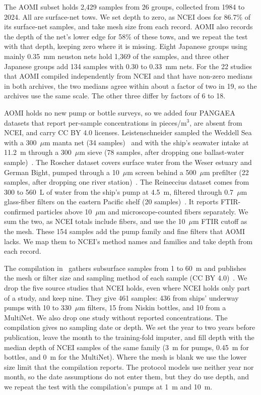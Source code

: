 \documentclass[12pt,a4paper]{report}
\begin{document}
The AOMI subset holds 2,429 samples from 26 groups, collected from 1984 to 2024. All are surface-net tows. We set depth to zero, as NCEI does for 86.7\% of its surface-net samples, and take mesh size from each record. AOMI also records the depth of the net's lower edge for 58\% of these tows, and we repeat the test with that depth, keeping zero where it is missing. Eight Japanese groups using mainly 0.35~mm neuston nets hold 1,369 of the samples, and three other Japanese groups add 134 samples with 0.30 to 0.33~mm nets. For the 22 studies that AOMI compiled independently from NCEI and that have non-zero medians in both archives, the two medians agree within about a factor of two in 19, so the archives use the same scale. The other three differ by factors of 6 to 18.

AOMI holds no new pump or bottle surveys, so we added four PANGAEA datasets that report per-sample concentrations in pieces/m$^3$, are absent from NCEI, and carry CC BY 4.0 licenses. Leistenschneider sampled the Weddell Sea with a 300~$\mu$m manta net (34 samples)~\cite{leistenschneider2023surface} and with the ship's seawater intake at 11.2~m through a 300~$\mu$m sieve (78 samples, after dropping one ballast-water sample)~\cite{leistenschneider2022subsurface}. The Roscher dataset covers surface water from the Weser estuary and German Bight, pumped through a 10~$\mu$m screen behind a 500~$\mu$m prefilter (22 samples, after dropping one river station)~\cite{roscher2021}. The Reineccius dataset comes from 300 to 560~L of water from the ship's pump at 4.5~m, filtered through 0.7~$\mu$m glass-fiber filters on the eastern Pacific shelf (20 samples)~\cite{reineccius2026}. It reports FTIR-confirmed particles above 10~$\mu$m and microscope-counted fibers separately. We sum the two, as NCEI totals include fibers, and use the 10~$\mu$m FTIR cutoff as the mesh. These 154 samples add the pump family and fine filters that AOMI lacks. We map them to NCEI's method names and families and take depth from each record.

The compilation in~\cite{zhao2025} gathers subsurface samples from 1 to 60~m and publishes the mesh or filter size and sampling method of each sample (CC BY 4.0)~\cite{zhao2025data}. We drop the five source studies that NCEI holds, even where NCEI holds only part of a study, and keep nine. They give 461 samples: 436 from ships' underway pumps with 10 to 330~$\mu$m filters, 15 from Niskin bottles, and 10 from a MultiNet. We also drop one study without reported concentrations. The compilation gives no sampling date or depth. We set the year to two years before publication, leave the month to the training-fold imputer, and fill depth with the median depth of NCEI samples of the same family (3~m for pumps, 0.45~m for bottles, and 0~m for the MultiNet). Where the mesh is blank we use the lower size limit that the compilation reports. The protocol models use neither year nor month, so the date assumptions do not enter them, but they do use depth, and we repeat the test with the compilation's pumps at 1~m and 10~m.
\end{document}
